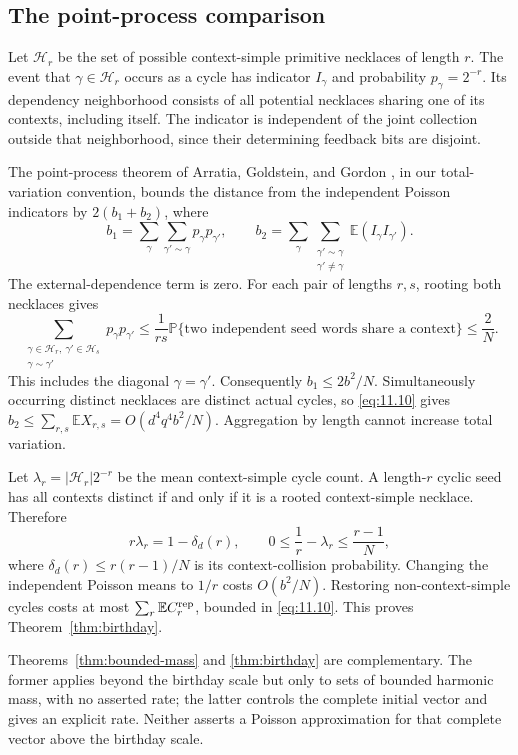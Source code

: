 \documentclass[11pt]{article}
\theoremstyle{remark}
\begin{document}
\subsection{The point-process comparison}
Let $\mathcal H_r$ be the set of possible context-simple primitive necklaces
of length $r$. The event that $\gamma\in\mathcal H_r$ occurs as a cycle has
indicator $I_\gamma$ and probability $p_\gamma=2^{-r}$.
Its dependency neighborhood consists of all potential necklaces sharing
one of its contexts, including itself. The indicator is independent of the
joint collection outside that neighborhood, since their determining
feedback bits are disjoint.

The point-process theorem of Arratia, Goldstein, and Gordon
\cite[Theorem~2]{AGG}, in our total-variation convention, bounds the distance
from the independent Poisson indicators by $2(b_1+b_2)$, where
\[
 b_1=\sum_\gamma\sum_{\gamma'\sim\gamma}p_\gamma p_{\gamma'},
 \qquad
 b_2=\sum_\gamma\sum_{\substack{\gamma'\sim\gamma\\\gamma'\ne\gamma}}
 \mathbb E(I_\gamma I_{\gamma'}).
\]
The external-dependence term is zero.
For each pair of lengths $r,s$, rooting both necklaces gives
\[
 \sum_{\substack{\gamma\in\mathcal H_r,\ \gamma'\in\mathcal H_s\\
                  \gamma\sim\gamma'}}p_\gamma p_{\gamma'}
 \le\frac1{rs}\mathbb P\{
 \text{two independent seed words share a context}\}
 \le\frac2N.
\]
This includes the diagonal $\gamma=\gamma'$.
Consequently $b_1\le2b^2/N$. Simultaneously occurring distinct necklaces
are distinct actual cycles, so \eqref{eq:11.10} gives
$b_2\le\sum_{r,s}\mathbb EX_{r,s}=O(d^4q^4b^2/N)$.
Aggregation by length cannot increase total variation.

Let $\lambda_r=|\mathcal H_r|2^{-r}$ be the mean context-simple cycle count.
A length-$r$ cyclic seed has all contexts distinct if and only if it is a
rooted context-simple necklace. Therefore
\[
 r\lambda_r=1-\delta_d(r),
 \qquad
 0\le\frac1r-\lambda_r\le\frac{r-1}{N},
\]
where $\delta_d(r)\le r(r-1)/N$ is its context-collision probability.
Changing the independent Poisson means to $1/r$ costs $O(b^2/N)$.
Restoring non-context-simple cycles costs at most
$\sum_r\mathbb EC_r^{\rm rep}$, bounded in \eqref{eq:11.10}.
This proves Theorem~\ref{thm:birthday}.

Theorems~\ref{thm:bounded-mass} and \ref{thm:birthday} are complementary.
The former applies beyond the birthday scale but only to sets of bounded
harmonic mass, with no asserted rate; the latter controls the complete
initial vector and gives an explicit rate. Neither asserts a Poisson
approximation for that complete vector above the birthday scale.
\end{document}
